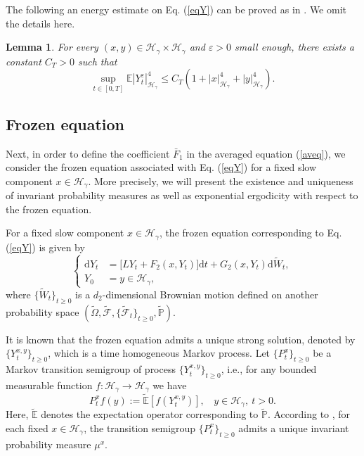 \documentclass[10pt,a4paper]{article}
\newtheorem{lemma}{Lemma}[section]
\numberwithin{equation}{section}
\begin{document}
The following an energy estimate on Eq. (\ref{eqY}) can be proved as in \cite[Lemma 4.1]{LLPX25}. We omit the details here.
\begin{lemma}\label{avlemma1}
	For every $(x,y) \in \mathcal H_\gamma \times \mathcal H_\gamma$ and $\varepsilon >0$ small enough, there exists a constant $C_T> 0$ such that
	\begin{equation}\label{Yest}
		\sup_{t\in[0,T]}\mathbb{E}|Y_{t}^{\varepsilon}|_{\mathcal H_\gamma }^4
		\leq  C_T(1+| x |_{\mathcal H_\gamma }^4+| y |_{\mathcal H_\gamma }^4).
	\end{equation}
\end{lemma}

\subsection{Frozen equation}

Next, in order to define the coefficient $\bar{F}_1$ in the averaged equation (\ref{aveq}), we consider the frozen equation associated with Eq. (\ref{eqY}) for a fixed slow component $x\in \mathcal H_\gamma$.
More precisely, we will present the existence and uniqueness of invariant probability measures as well as exponential ergodicity with respect to the frozen equation.

For a fixed slow component $x \in \mathcal H_\gamma$, the frozen equation corresponding to Eq. (\ref{eqY}) is given by
\begin{equation*}
	\left\{ \begin{aligned}
		\mathrm{d} Y_t&=\big[L Y_t+F_2(x,Y_t)\big] \mathrm{d} t+G_2(x,Y_t) \mathrm{d} \widetilde{W}_t,\\
		Y_0&= y \in \mathcal H_\gamma ,
	\end{aligned} \right.
\end{equation*}
where $\{\widetilde{W}_t\}_{t\geq0}$ is a $d_2$-dimensional Brownian motion defined on another probability space $(\widetilde{\Omega} ,\widetilde{\mathcal F},\{\widetilde{\mathcal F}_t\}_{t\geq0},\widetilde{\mathbb P})$.






It is known that the frozen equation admits a unique strong solution, denoted by $\{Y_t^{x,y}\}_{t\geq 0}$, which is a time homogeneous Markov process.
Let $\{P^x_t\}_{t\geq0}$ be a Markov transition semigroup of process $\{Y^{x,y}_t\}_{t\geq 0}$, i.e., for any bounded measurable function $f:\mathcal{H}_\gamma \rightarrow \mathcal{H}_\gamma $ we have
$$P^x_t f(y):=\widetilde{\mathbb E} [f(Y^{x,y}_t)],~~~~ y \in \mathcal{H}_\gamma,~t>0.$$
Here, $\widetilde{\mathbb E}$ denotes the expectation operator corresponding to $\widetilde{\mathbb P}$.
According to \cite[Theorem 2.2]{HLL20}, for each fixed $x \in \mathcal H_\gamma$, the transition semigroup $\{P^x_t\}_{t\geq0}$ admits a unique invariant probability measure $\mu^x$.
\end{document}

